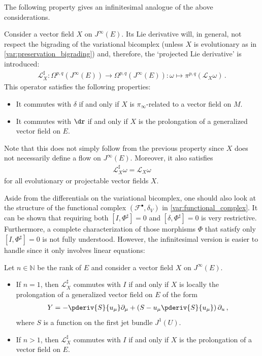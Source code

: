     The following property gives an infinitesimal analogue of the above considerations.
    \begin{property}
        Consider a vector field $X$ on $J^\infty(E)$. Its Lie derivative will, in general, not respect the bigrading of the variational bicomplex (unless $X$ is evolutionary as in \cref{var:preservation_bigrading}) and, therefore, the `projected Lie derivative' is introduced:
        \begin{gather}
            \mathcal{L}^\sharp_X:\Omega^{p,q}(J^\infty(E))\rightarrow\Omega^{p,q}(J^\infty(E)):\omega\mapsto\pi^{p,q}(\mathcal{L}_X\omega)\,.
        \end{gather}
        This operator satisfies the following properties:
        \begin{itemize}
            \item It commutes with $\delta$ if and only if $X$ is $\pi_\infty$-related to a vector field on $M$.
            \item It commutes with $\dr$ if and only if $X$ is the prolongation of a generalized vector field on $E$.
        \end{itemize}
        Note that this does not simply follow from the previous property since $X$ does not necessarily define a flow on $J^\infty(E)$. Moreover, it also satisfies
        \begin{gather}
            \mathcal{L}^\sharp_X\omega=\mathcal{L}_X\omega
        \end{gather}
        for all evolutionary or projectable vector fields $X$.
    \end{property}

    Aside from the differentials on the variational bicomplex, one should also look at the structure of the functional complex $(\mathcal{F}^\bullet,\delta_V)$ in \cref{var:functional_complex}. It can be shown that requiring both $[I,\Phi^\sharp]=0$ and $[\delta,\Phi^\sharp]=0$ is very restrictive. Furthermore, a complete characterization of those morphisms $\Phi$ that satisfy only $[I,\Phi^\sharp]=0$ is not fully understood. However, the infinitesimal version is easier to handle since it only involves linear equations:
    \begin{property}
        Let $n\in\mathbb{N}$ be the rank of $E$ and consider a vector field $X$ on $J^\infty(E)$.
        \begin{itemize}
            \item If $n=1$, then $\mathcal{L}^\sharp_X$ commutes with $I$ if and only if $X$ is locally the prolongation of a generalized vector field on $E$ of the form
            \begin{gather}
                Y = -\pderiv{S}{u_\mu}\partial_\mu + \left(S - u_\mu\pderiv{S}{u_\mu}\right)\partial_u\,,
            \end{gather}
            where $S$ is a function on the first jet bundle $J^1(U)$.
            \item If $n>1$, then $\mathcal{L}^\sharp_X$ commutes with $I$ if and only if $X$ is the prolongation of a vector field on $E$.
        \end{itemize}
    \end{property}

